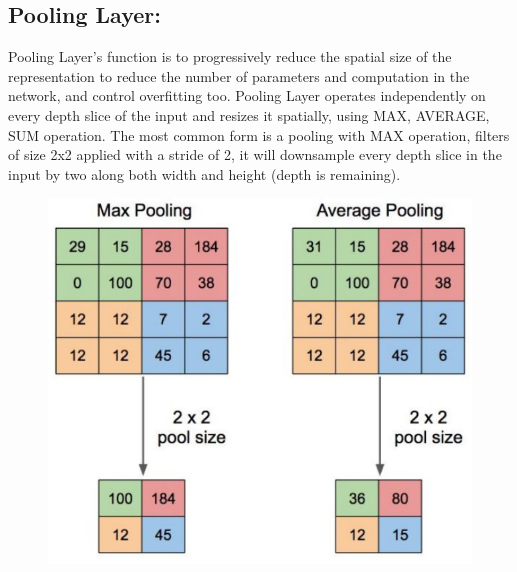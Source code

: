 \subsection{Pooling Layer:}
Pooling Layer's function is to progressively reduce the spatial size of the representation to reduce the number of parameters and computation in the network, and control overfitting too. Pooling Layer operates independently on every depth slice of the input and resizes it spatially, using MAX, AVERAGE, SUM operation. The most common form is a pooling with MAX operation, filters of size 2x2 applied with a stride of 2, it will downsample every depth slice in the input by two along both width and height (depth is remaining).\\
\begin{center}
  \begin{figure}[H]
  \centering
  \includegraphics[width=1\columnwidth]{images/chap2/Pooling.png}
  \label{chap2:MaxPooling and Average Polling}
  \end{figure}
\end{center}

